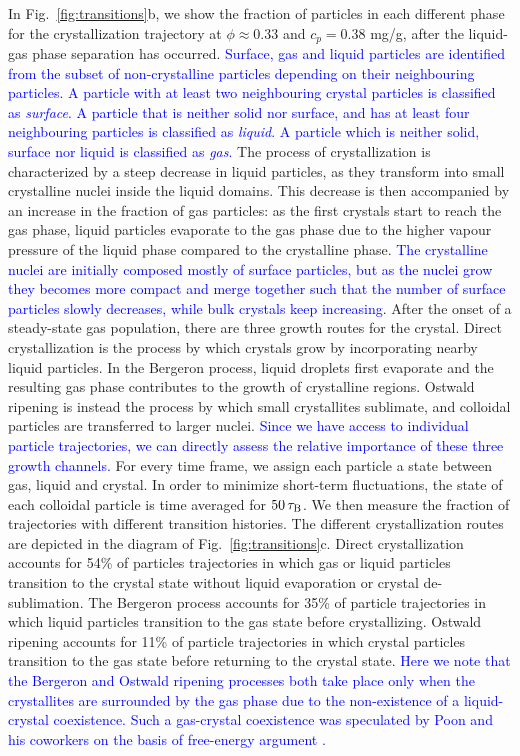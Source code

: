 \documentclass[preprint,amsmath,amssymb,superscriptaddress]{revtex4-1}
\begin{document}
In Fig.~\ref{fig:transitions}b, we show  the fraction of particles in each different phase for the crystallization trajectory at
$\phi\approx 0.33$ and $c_p=0.38$ mg/g, after the liquid-gas phase separation has occurred.
\textcolor{blue}{Surface, gas and liquid particles are identified from the subset of non-crystalline particles depending
on their neighbouring particles. A particle with at least two neighbouring crystal particles is classified as
\emph{surface}. A particle that is neither solid nor surface, and has at least four neighbouring particles
is classified as \emph{liquid}. A particle which is neither solid, surface nor liquid is classified as \emph{gas}.}
The process of crystallization is characterized 
by a steep decrease in liquid particles, as they transform into small crystalline nuclei inside the liquid domains. This decrease
is then accompanied by an increase in the fraction of gas particles: as the first crystals start to reach the gas phase, liquid particles evaporate 
to the gas phase due to the higher vapour pressure of the liquid phase compared to the crystalline phase. \textcolor{blue}{The crystalline nuclei are initially composed mostly of surface particles, but as the nuclei grow they becomes more compact and merge together such that the number of surface particles slowly decreases, while bulk crystals keep increasing}.
After the onset of a steady-state gas population, there are three growth routes for the crystal. 
Direct crystallization is the process by which crystals grow by incorporating nearby liquid particles. 
In the Bergeron process, liquid droplets first evaporate and the resulting gas phase contributes to the growth of crystalline regions. Ostwald ripening is instead the process by which small crystallites sublimate, and colloidal particles are transferred to larger nuclei.
\textcolor{blue}{Since we have access to individual particle trajectories, we can directly assess the relative importance of these three growth channels.}
For every time frame, we assign each particle a state between gas, liquid and crystal. In order to minimize short-term fluctuations, the state of each colloidal particle is time averaged for $50\,\tau_{\rm B}$. We then measure the fraction of trajectories with different transition histories.
The different crystallization routes are depicted in the diagram of Fig.~\ref{fig:transitions}c.
Direct crystallization accounts for 54\% of particles trajectories in which gas or liquid particles transition to the crystal state without liquid evaporation or crystal de-sublimation. 
The Bergeron process accounts for 35\% of particle trajectories in which liquid particles transition to the gas state before crystallizing. 
Ostwald ripening accounts for 11\% of particle trajectories in which crystal particles transition to the gas state before returning to the crystal state. \textcolor{blue}{Here we note that the Bergeron and Ostwald ripening processes both take place only when the crystallites are 
surrounded by the gas phase due to the non-existence of a liquid-crystal coexistence. Such a gas-crystal coexistence was speculated  by Poon and his coworkers on the basis of free-energy argument \cite{poon1999cpm,renth2001phase}.} 
 
\end{document}
